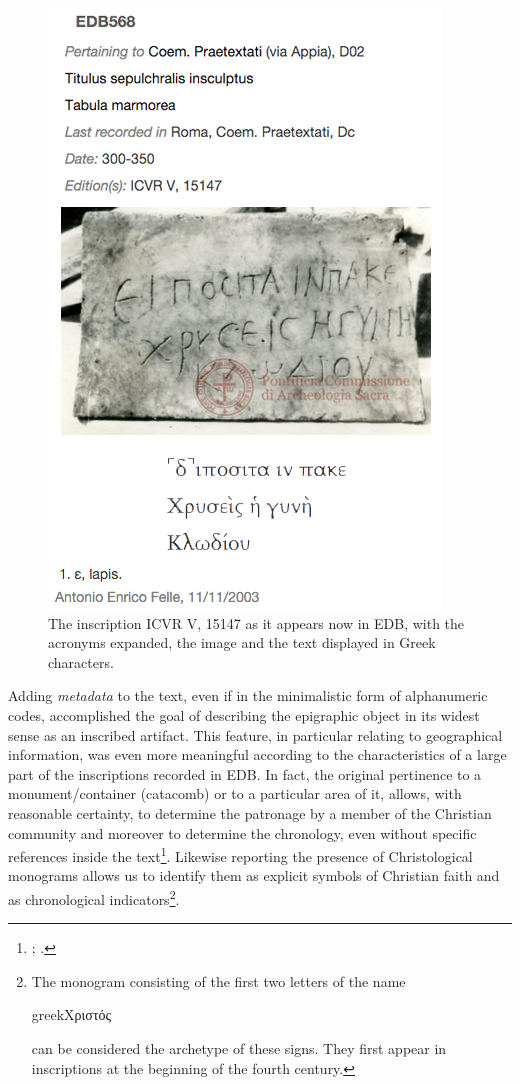 \documentclass[amsthm,ebook]{saparticle}
\begin{document}
\begin{figure}[hbp]
\centering
 \includegraphics[scale=0.4]{EAGLE2016Roccoengrev-img002.jpg} 
\caption{The inscription ICVR V, 15147 as it appears now in EDB, with the acronyms expanded, the image and the text
displayed in Greek characters.}
\label{fig:2}
\end{figure}




Adding \emph{metadata} to the text, even if in the minimalistic form of alphanumeric codes, accomplished the goal of describing
the epigraphic object in its widest sense as an inscribed artifact. This feature, in particular relating to
geographical information, was even more meaningful according to the characteristics of a large part of the inscriptions
recorded in EDB. In fact, the original pertinence to a monument/container (catacomb) or to a particular area of it,
allows, with reasonable certainty, to determine the patronage by a member of the Christian community and moreover to
determine the chronology, even without specific references inside the text\footnote{\citet{carletti_inscriptiones_1994}; \citet[viii-ix]{felle_introduzione_1997}.}. Likewise reporting the presence of Christological monograms allows us to identify them as explicit symbols
of Christian faith and as chronological indicators\footnote{ The monogram consisting of the first two letters of the
name \begin{otherlanguage*}{greek}Χριστός\end{otherlanguage*} can be considered the archetype of these signs. They first appear in inscriptions at the
beginning of the fourth century.}. 
\end{document}
